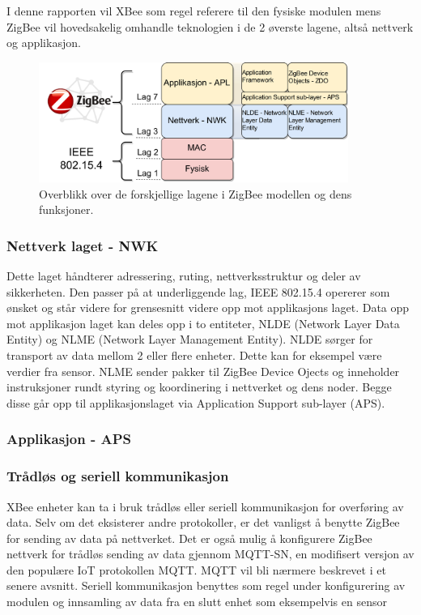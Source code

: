 \documentclass{article}
\begin{document}
I denne rapporten vil XBee som regel referere til den fysiske modulen mens ZigBee vil hovedsakelig omhandle teknologien i de 2 øverste lagene, altså nettverk og applikasjon.

\begin{figure}[h!]
 \centering
     \includegraphics[width=0.9\textwidth]{zigbeeosimodellv2}
 \caption{Overblikk over de forskjellige lagene i ZigBee modellen og dens funksjoner.}
\end{figure}

\subsubsection{Nettverk laget - NWK}
Dette laget håndterer adressering, ruting, nettverksstruktur og deler av sikkerheten. Den passer på at underliggende lag, IEEE 802.15.4 opererer som ønsket og står videre for grensesnitt videre opp mot applikasjons laget. Data opp mot applikasjon laget kan deles opp i to entiteter, NLDE (Network Layer Data Entity) og NLME (Network Layer Management Entity). NLDE sørger for transport av data mellom 2 eller flere enheter.  Dette kan for eksempel være verdier fra sensor. NLME sender pakker til ZigBee Device Ojects og inneholder instruksjoner rundt styring og koordinering i nettverket og dens noder. Begge disse går opp til applikasjonslaget via Application Support sub-layer (APS).

\subsubsection{Applikasjon - APS}

\subsubsection{Trådløs og seriell kommunikasjon}
XBee enheter kan ta i bruk trådløs eller seriell kommunikasjon for overføring av data. Selv om det eksisterer andre protokoller, er det vanligst å benytte ZigBee for sending av data på nettverket. Det er også mulig å konfigurere ZigBee nettverk for trådløs sending av data gjennom MQTT-SN, en modifisert versjon av den populære IoT protokollen MQTT. MQTT vil bli nærmere beskrevet i et senere avsnitt. Seriell kommunikasjon benyttes som regel under konfigurering av modulen og innsamling av data fra en slutt enhet som eksempelvis en sensor
\end{document}
